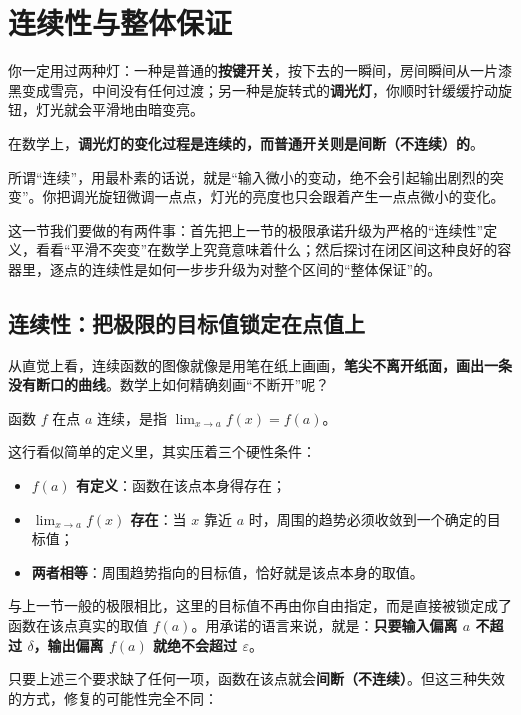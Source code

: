 \section{连续性与整体保证}
\label{sec:02-Calculus/02-Limits-and-Continuity/04}

你一定用过两种灯：一种是普通的\textbf{按键开关}，按下去的一瞬间，房间瞬间从一片漆黑变成雪亮，中间没有任何过渡；另一种是旋转式的\textbf{调光灯}，你顺时针缓缓拧动旋钮，灯光就会平滑地由暗变亮。

在数学上，\textbf{调光灯的变化过程是连续的，而普通开关则是间断（不连续）的}。

所谓``连续''，用最朴素的话说，就是``输入微小的变动，绝不会引起输出剧烈的突变''。你把调光旋钮微调一点点，灯光的亮度也只会跟着产生一点点微小的变化。

这一节我们要做的有两件事：首先把上一节的极限承诺升级为严格的``连续性''定义，看看``平滑不突变''在数学上究竟意味着什么；然后探讨在闭区间这种良好的容器里，逐点的连续性是如何一步步升级为对整个区间的``整体保证''的。

\subsection{连续性：把极限的目标值锁定在点值上}

从直觉上看，连续函数的图像就像是用笔在纸上画画，\textbf{笔尖不离开纸面，画出一条没有断口的曲线}。数学上如何精确刻画``不断开''呢？

\begin{definition}
函数 \(f\) 在点 \(a\) 连续，是指 \(\lim_{x\to a}f(x)=f(a)\)。
\end{definition}

这行看似简单的定义里，其实压着三个硬性条件：

\begin{itemize}
\tightlist
  \item \textbf{\(f(a)\) 有定义}：函数在该点本身得存在；
  \item \textbf{\(\lim_{x\to a}f(x)\) 存在}：当 \(x\) 靠近 \(a\) 时，周围的趋势必须收敛到一个确定的目标值；
  \item \textbf{两者相等}：周围趋势指向的目标值，恰好就是该点本身的取值。
\end{itemize}

与上一节一般的极限相比，这里的目标值不再由你自由指定，而是直接被锁定成了函数在该点真实的取值 \(f(a)\)。用承诺的语言来说，就是：\textbf{只要输入偏离 \(a\) 不超过 \(\delta\)，输出偏离 \(f(a)\) 就绝不会超过 \(\varepsilon\)}。

只要上述三个要求缺了任何一项，函数在该点就会\textbf{间断（不连续）}。但这三种失效的方式，修复的可能性完全不同：

